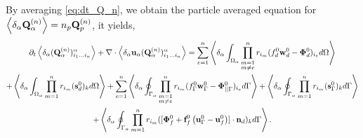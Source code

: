 
By averaging \ref{eq:dt_Q_n}, we obtain the particle averaged equation for $\left<\delta_\alpha \textbf{Q}_\alpha^{(n)}\right> = n_p\textbf{Q}_p^{(n)} $, it yields,
\begin{multline*}
    \partial_t \left<\delta_\alpha (\textbf{Q}_\alpha^{(n)})_{i_1\ldots i_n}^\alpha\right>
    + \mathbf{\nabla}\cdot  \left<\delta_\alpha \textbf{u}_\alpha (\textbf{Q}_\alpha^{(n)})_{i_1\ldots i_n}^\alpha\right>
    = \sum_{e=1}^{n} 
    \left<\delta_\alpha \int_{\Omega_{\alpha}} 
        \prod^{n}_{\substack{ m=1 \\m \neq e}} r_{i_m} (f_d^0\textbf{w}_d^0  - \bm\Phi_d^0)_{i_e}
     d\Omega\right>\\
    + \left<\delta_\alpha \int_{\Omega_{\alpha}}  \prod_{m=1}^{n} r_{i_m} (\textbf{s}_d^0)_k  d\Omega\right>
    +     
    \sum_{e=1}^{n} 
    \left<\delta_\alpha \oint_{\Gamma_{\alpha}} 
        \prod^{n}_{\substack{ m=1 \\m \neq e}} r_{i_m} (f_\Gamma^0\textbf{w}_\Gamma^0 - \bm\Phi_{||\Gamma}^0)_{i_e}
     d\Gamma\right>
    + \left<\delta_\alpha \oint_{\Gamma_{\alpha}}  \prod_{m=1}^{n} r_{i_m} (\textbf{s}_\Gamma^0)_k  d\Gamma\right>\\
    +\left<\delta_\alpha \oint_{\Gamma_{\alpha}}  \prod_{m=1}^{n} r_{i_m} ([\bm\Phi_f^0 + \textbf{f}_f^0 \left(\textbf{u}_\Gamma^0 - \textbf{u}_f^0\right)]\cdot \textbf{n}_d)_k  d\Gamma\right>. 
\end{multline*}

